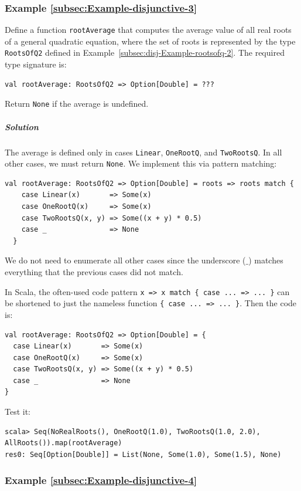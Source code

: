 \subsubsection{Example \label{subsec:Example-disjunctive-3}\ref{subsec:Example-disjunctive-3}}

Define a function \lstinline!rootAverage! that computes the average
value of all real roots of a general quadratic equation, where the
set of roots is represented by the type \lstinline!RootsOfQ2! defined
in Example~\ref{subsec:disj-Example-rootsofq-2}. The required type
signature is:
\begin{lstlisting}
val rootAverage: RootsOfQ2 => Option[Double] = ???
\end{lstlisting}
Return \lstinline!None! if the average is undefined.

\subparagraph{Solution}

The average is defined only in cases \lstinline!Linear!, \lstinline!OneRootQ!,
and \lstinline!TwoRootsQ!. In all other cases, we must return \lstinline!None!.
We implement this via pattern matching:
\begin{lstlisting}
val rootAverage: RootsOfQ2 => Option[Double] = roots => roots match {
    case Linear(x)       => Some(x)
    case OneRootQ(x)     => Some(x)
    case TwoRootsQ(x, y) => Some((x + y) * 0.5)
    case _               => None
  }
\end{lstlisting}
We do not need to enumerate all other cases since the underscore ($\_$)
matches everything that the previous cases did not match.

In Scala, the often-used code pattern \lstinline!x => x match { case ... => ... }!
can be shortened to just the nameless function \lstinline!{ case ... => ... }!.
Then the code is:
\begin{lstlisting}
val rootAverage: RootsOfQ2 => Option[Double] = {
  case Linear(x)       => Some(x)
  case OneRootQ(x)     => Some(x)
  case TwoRootsQ(x, y) => Some((x + y) * 0.5)
  case _               => None
}
\end{lstlisting}
Test it:
\begin{lstlisting}
scala> Seq(NoRealRoots(), OneRootQ(1.0), TwoRootsQ(1.0, 2.0), AllRoots()).map(rootAverage)
res0: Seq[Option[Double]] = List(None, Some(1.0), Some(1.5), None)
\end{lstlisting}


\subsubsection{Example \label{subsec:Example-disjunctive-4}\ref{subsec:Example-disjunctive-4}}

